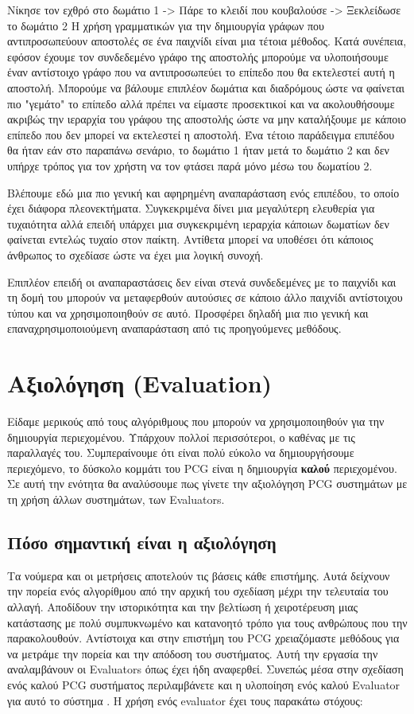 \newline
Νίκησε τον εχθρό στο δωμάτιο 1 -> Πάρε το κλειδί που κουβαλούσε -> Ξεκλείδωσε το δωμάτιο 2 
\newline
Η χρήση γραμματικών για την δημιουργία γράφων που αντιπροσωπεύουν αποστολές σε ένα παιχνίδι είναι μια τέτοια μέθοδος. Κατά συνέπεια, εφόσον έχουμε τον συνδεδεμένο γράφο της αποστολής μπορούμε να υλοποιήσουμε έναν αντίστοιχο γράφο που να αντιπροσωπεύει το επίπεδο που θα εκτελεστεί αυτή η αποστολή. Μπορούμε να βάλουμε επιπλέον δωμάτια και διαδρόμους ώστε να φαίνεται πιο "γεμάτο" το επίπεδο αλλά πρέπει να είμαστε προσεκτικοί και να ακολουθήσουμε ακριβώς την ιεραρχία του γράφου της αποστολής ώστε να μην καταλήξουμε με κάποιο επίπεδο που δεν μπορεί να εκτελεστεί η αποστολή. Ένα τέτοιο παράδειγμα επιπέδου θα ήταν εάν στο παραπάνω σενάριο, το δωμάτιο 1 ήταν μετά το δωμάτιο 2 και δεν υπήρχε τρόπος για τον χρήστη να τον φτάσει παρά μόνο μέσω του δωματίου 2.
\par
Βλέπουμε εδώ μια πιο γενική και αφηρημένη αναπαράσταση ενός επιπέδου, το οποίο έχει διάφορα πλεονεκτήματα. Συγκεκριμένα δίνει μια μεγαλύτερη ελευθερία για τυχαιότητα αλλά επειδή υπάρχει μια συγκεκριμένη ιεραρχία κάποιων δωματίων δεν φαίνεται εντελώς τυχαίο στον παίκτη. Αντίθετα μπορεί να υποθέσει ότι κάποιος άνθρωπος το σχεδίασε ώστε να έχει μια λογική συνοχή.
\par
Επιπλέον επειδή οι αναπαραστάσεις δεν είναι στενά συνδεδεμένες με το παιχνίδι και τη δομή του μπορούν να μεταφερθούν αυτούσιες σε κάποιο άλλο παιχνίδι αντίστοιχου τύπου και να χρησιμοποιηθούν σε αυτό. Προσφέρει δηλαδή μια πιο γενική και επαναχρησιμοποιούμενη αναπαράσταση από τις προηγούμενες μεθόδους.


\section{Αξιολόγηση (Evaluation)}
Είδαμε μερικούς από τους αλγόριθμους που μπορούν να χρησιμοποιηθούν για την δημιουργία περιεχομένου. Υπάρχουν πολλοί περισσότεροι, ο καθένας με τις παραλλαγές του. Συμπεραίνουμε ότι είναι πολύ εύκολο να δημιουργήσουμε περιεχόμενο, το δύσκολο κομμάτι του PCG είναι η δημιουργία \textbf{καλού} περιεχομένου. Σε αυτή την ενότητα θα αναλύσουμε πως γίνετε την αξιολόγηση PCG συστημάτων με τη χρήση άλλων συστημάτων, των Evaluators. \cite{pcgevaluation}

\subsection{Πόσο σημαντική είναι η αξιολόγηση}
Τα νούμερα και οι μετρήσεις αποτελούν τις βάσεις κάθε επιστήμης. Αυτά δείχνουν την πορεία ενός αλγορίθμου από την αρχική του σχεδίαση μέχρι την τελευταία του αλλαγή. Αποδίδουν την ιστορικότητα και την βελτίωση ή χειροτέρευση μιας κατάστασης με πολύ συμπυκνωμένο και κατανοητό τρόπο για τους ανθρώπους που την παρακολουθούν. Αντίστοιχα και στην επιστήμη του PCG χρειαζόμαστε μεθόδους για να μετράμε την πορεία και την απόδοση του συστήματος. Αυτή την εργασία την αναλαμβάνουν οι Evaluators όπως έχει ήδη αναφερθεί. Συνεπώς μέσα στην σχεδίαση ενός καλού PCG συστήματος περιλαμβάνετε και η υλοποίηση ενός καλού Evaluator για αυτό το σύστημα \cite{genericevaluation}. Η χρήση ενός evaluator έχει τους παρακάτω στόχους:


